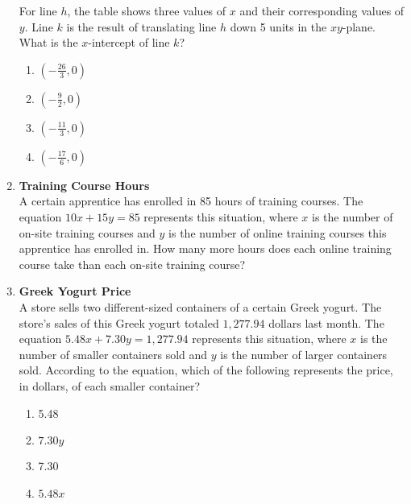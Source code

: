 \begin{enumerate}
For line $h$, the table shows three values of $x$ and their corresponding values of $y$. Line $k$ is the result of translating line $h$ down 5 units in the $xy$-plane. What is the $x$-intercept of line $k$?
\begin{enumerate}[label=(\Alph*)]
  \item $\left(-\frac{26}{3}, 0\right)$
  \item $\left(-\frac{9}{2}, 0\right)$
  \item $\left(-\frac{11}{3}, 0\right)$
  \item $\left(-\frac{17}{6}, 0\right)$
\end{enumerate}
\begin{subanswer}
\end{subanswer}

\item \textbf{Training Course Hours}\\
A certain apprentice has enrolled in 85 hours of training courses. The equation $10x + 15y = 85$ represents this situation, where $x$ is the number of on-site training courses and $y$ is the number of online training courses this apprentice has enrolled in. How many more hours does each online training course take than each on-site training course?
\begin{subanswer}
\end{subanswer}

\item \textbf{Greek Yogurt Price}\\
A store sells two different-sized containers of a certain Greek yogurt. The store's sales of this Greek yogurt totaled $1,277.94$ dollars last month. The equation $5.48x + 7.30y = 1,277.94$ represents this situation, where $x$ is the number of smaller containers sold and $y$ is the number of larger containers sold. According to the equation, which of the following represents the price, in dollars, of each smaller container?
\begin{enumerate}[label=(\Alph*)]
  \item 5.48
  \item $7.30y$
  \item 7.30
  \item $5.48x$
\end{enumerate}
\begin{subanswer}
\end{subanswer}

\newpage


\end{enumerate}
